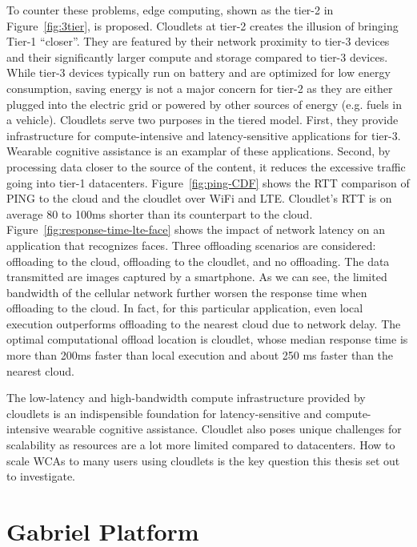 To counter these problems, edge computing, shown as the tier-2 in
Figure~\ref{fig:3tier}, is proposed. Cloudlets at tier-2 creates the illusion of
bringing Tier-1 ``closer''. They are featured by their network proximity to
tier-3 devices and their significantly larger compute and storage compared to
tier-3 devices. While tier-3 devices typically run on battery and are optimized
for low energy consumption, saving energy is not a major concern for tier-2 as
they are either plugged into the electric grid or powered by other sources of
energy (e.g. fuels in a vehicle). Cloudlets serve two purposes in the tiered
model. First, they provide infrastructure for compute-intensive and
latency-sensitive applications for tier-3. Wearable cognitive assistance is an
examplar of these applications. Second, by processing data closer to the source
of the content, it reduces the excessive traffic going into tier-1 datacenters.
Figure~\ref{fig:ping-CDF} shows the RTT comparison of PING to the cloud and the
cloudlet over WiFi and LTE. Cloudlet's RTT is on average 80 to 100ms shorter
than its counterpart to the cloud. Figure~\ref{fig:response-time-lte-face} shows
the impact of network latency on an application that recognizes faces. Three
offloading scenarios are considered: offloading to the cloud, offloading to the
cloudlet, and no offloading. The data transmitted are images captured by a
smartphone. As we can see, the limited bandwidth of the cellular network further
worsen the response time when offloading to the cloud. In fact, for this
particular application, even local execution outperforms offloading to the
nearest cloud due to network delay. The optimal computational offload location
is cloudlet, whose median response time is more than 200ms faster than local
execution and about 250 ms faster than the nearest cloud.

The low-latency and high-bandwidth compute infrastructure provided by cloudlets
is an indispensible foundation for latency-sensitive and compute-intensive
wearable cognitive assistance. Cloudlet also poses unique challenges for
scalability as resources are a lot more limited compared to datacenters. How to
scale WCAs to many users using cloudlets is the key question this thesis set out to
investigate. 


\section{Gabriel Platform}
\label{sec: bg-gabriel}

